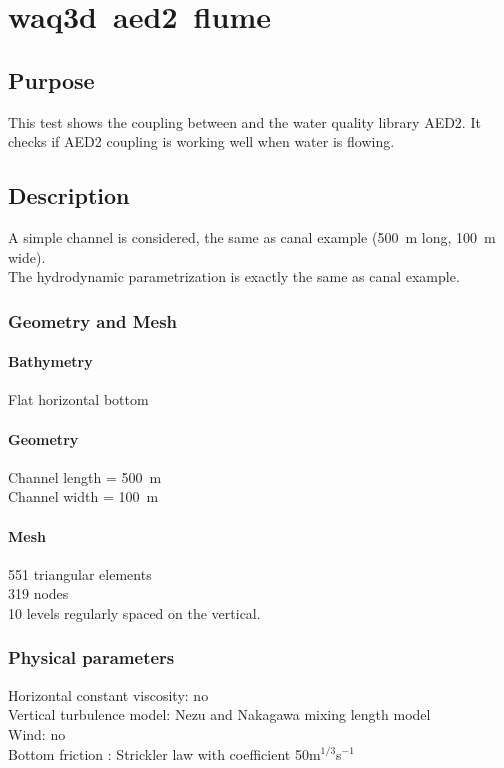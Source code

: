 
\chapter{waq3d~aed2~flume}
%
%
\section{Purpose}
%
This test shows the coupling between  and the water quality library AED2. It checks if AED2 coupling is working well when water is flowing.
%
\section{Description}
%
A simple channel is considered, the same as canal example (500~m long, 100~m wide).\\
The hydrodynamic parametrization is exactly the same as canal example.
%
\subsection{Geometry and Mesh}
%
%
\subsubsection{Bathymetry}
%
Flat horizontal bottom
%
\subsubsection{Geometry}
%
Channel length = 500~m\\
Channel width = 100~m
%
\subsubsection{Mesh}
%
551 triangular elements\\
319 nodes\\
10 levels regularly spaced on the vertical.
%
%
\subsection{Physical parameters}
Horizontal constant viscosity: no  \\
Vertical turbulence model: Nezu and Nakagawa mixing length model\\
Wind: no\\
Bottom friction : Strickler law with coefficient 50m$^{1/3}$s$^{-1}$
%
%
